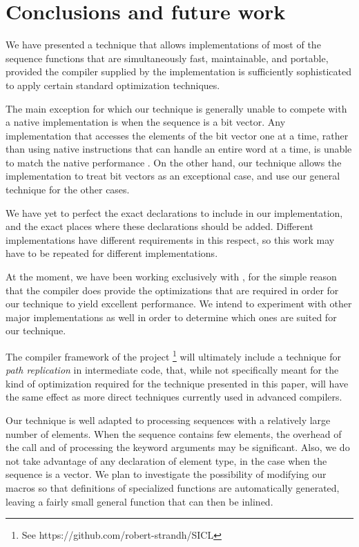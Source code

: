 \section{Conclusions and future work}

We have presented a technique that allows implementations of most of
the \commonlisp{} sequence functions that are simultaneously fast,
maintainable, and portable, provided the compiler supplied by the
implementation is sufficiently sophisticated to apply certain standard
optimization techniques.

The main exception for which our technique is generally unable to
compete with a native implementation is when the sequence is a bit
vector.  Any implementation that accesses the elements of the bit
vector one at a time, rather than using native instructions that can
handle an entire word at a time, is unable to match the native
performance \cite{Baker:1990:EIB:121989.121991}.  On the other hand,
our technique allows the \commonlisp{} implementation to treat bit
vectors as an exceptional case, and use our general technique for the
other cases.

We have yet to perfect the exact declarations to include in our
implementation, and the exact places where these declarations should
be added.  Different \commonlisp{} implementations have different
requirements in this respect, so this work may have to be repeated for
different implementations.

At the moment, we have been working exclusively with \sbcl{}, for the
simple reason that the \sbcl{} compiler does provide the optimizations
that are required in order for our technique to yield excellent
performance.  We intend to experiment with other major implementations
as well in order to determine which ones are suited for our
technique.

The \cleavir{} compiler framework of the \sicl{} project%
\footnote{See https://github.com/robert-strandh/SICL} will ultimately
include a technique for \emph{path replication} in intermediate code,
that, while not specifically meant for the kind of optimization
required for the technique presented in this paper, will have the same
effect as more direct techniques currently used in advanced
compilers.

Our technique is well adapted to processing sequences with a
relatively large number of elements.  When the sequence contains few
elements, the overhead of the call and of processing the keyword
arguments may be significant.  Also, we do not take advantage of any
declaration of element type, in the case when the sequence is a
vector.  We plan to investigate the possibility of modifying our
macros so that definitions of specialized functions are automatically
generated, leaving a fairly small general function that can then be
inlined.
